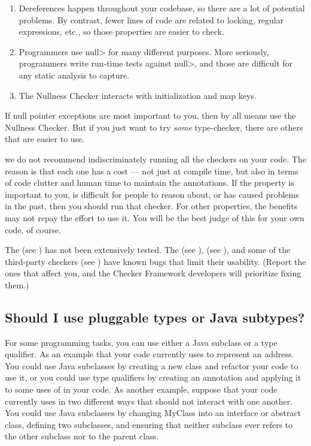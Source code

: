 \begin{enumerate}
\item
  Dereferences happen throughout your codebase, so there are a lot of
  potential problems.  By contrast, fewer lines of code are related to
  locking, regular expressions, etc., so those properties are easier to
  check.
\item
  Programmers use \<null> for many different purposes.  More seriously,
  programmers write run-time tests against \<null>, and those are difficult
  for any static analysis to capture.
\item
  The Nullness Checker interacts with initialization and map keys.
\end{enumerate}

If null pointer exceptions are most important to you, then by all means use
the Nullness Checker.  But if you just want to try \emph{some}
type-checker, there are others that are easier to use.

we do not recommend indiscriminately running all the checkers on your code.
The reason is that each one has a cost --- not just at compile time, but
also in terms of code clutter and human time to maintain the annotations.
If the property is important to you, is difficult for people to reason
about, or has caused problems in the past, then you should run that
checker.  For other properties, the benefits may not repay the effort to
use it.  You will be the best judge of this for your own code, of course.

The  (see
) has not been extensively tested.
The
 (see ),
 (see
), and some of the third-party checkers (see
)
have known bugs that limit their
usability.  (Report the ones that affect you, and the Checker Framework
developers will prioritize fixing them.)


\subsection{Should I use pluggable types or Java subtypes?\label{faq-typequals-vs-subtypes}}

\label{when-to-use-type-qualifiers}

For some programming tasks, you can use either a Java subclass or a type
qualifier.  As an example that your code currently uses  to
represent an address.  You could use Java subclasses by creating a new
 class and refactor your code to use it, or you could use
type qualifiers by creating an  annotation and applying it
to some uses of  in your code.  As another example, suppose
that your code currently uses  in two different ways that
should not interact with one another.  You could use Java subclasses by
changing MyClass into an interface or abstract class, defining two
subclasses, and ensuring that neither subclass ever refers to the other
subclass nor to the parent class.

